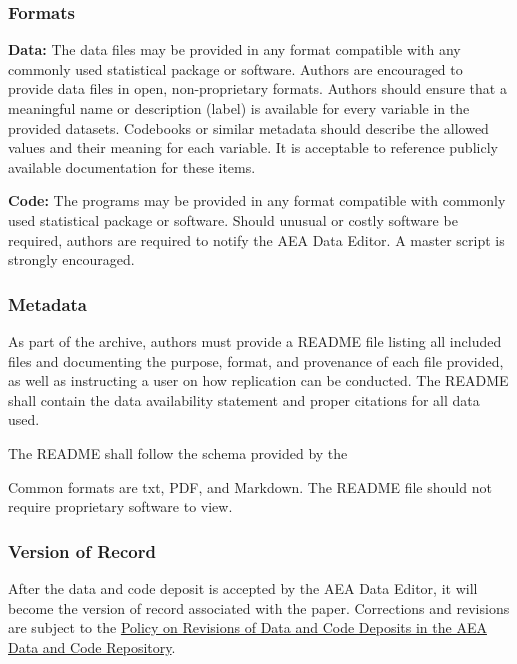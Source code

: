 \subsubsection{Formats}\label{formats}

\textbf{Data:} The data files may be provided in any format compatible
with any commonly used statistical package or software. Authors are
encouraged to provide data files in open, non-proprietary formats.
Authors should ensure that a meaningful name or description (label) is
available for every variable in the provided datasets. Codebooks or
similar metadata should describe the allowed values and their meaning
for each variable. It is acceptable to reference publicly available
documentation for these items.

\textbf{Code:} The programs may be provided in any format compatible
with commonly used statistical package or software. Should unusual or
costly software be required, authors are required to notify the AEA Data
Editor. A master script is strongly encouraged.

\subsubsection{Metadata}\label{metadata}

As part of the archive, authors must provide a README file listing all
included files and documenting the purpose, format, and provenance of
each file provided, as well as instructing a user on how replication can
be conducted. The README shall contain the data availability statement
and proper citations for all data used.

The README shall follow the schema provided by the

Common formats are txt, PDF, and Markdown. The README file should not
require proprietary software to view.

\subsubsection{Version of Record}\label{version-of-record}

After the data and code deposit is accepted by the AEA Data Editor, it
will become the version of record associated with the paper. Corrections
and revisions are subject to the \hyperref[policy-on-revisions-of-data-and-code-deposits-in-the-aea-data-and-code-repository]{Policy on Revisions of Data and Code Deposits in the AEA Data and Code Repository}.

